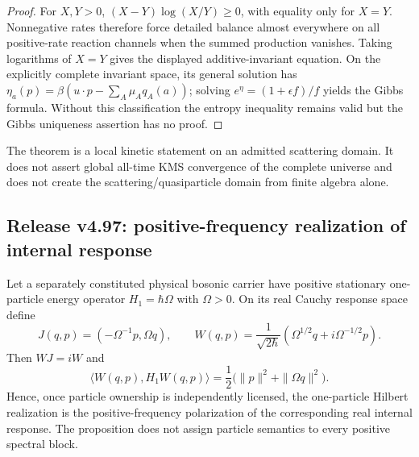 \documentclass[12pt,a4paper]{article}
\begin{document}
\begin{proof}
For $X,Y>0$, $(X-Y)\log(X/Y)\ge0$, with equality only for $X=Y$.
Nonnegative rates therefore force detailed balance almost everywhere on
all positive-rate reaction channels when the summed production vanishes.
Taking logarithms of $X=Y$ gives the displayed additive-invariant equation.
On the explicitly complete invariant space, its general solution has
$\eta_a(p)=\beta(u\cdot p-\sum_A\mu_Aq_A(a))$; solving
$e^\eta=(1+\epsilon f)/f$ yields the Gibbs formula.  Without this
classification the entropy inequality remains valid but the Gibbs
uniqueness assertion has no proof.
\end{proof}

\begin{remark}[Scope]
\label{p4:rem:v496-local-not-global-kms}
The theorem is a local kinetic statement on an admitted scattering domain.  It
does not assert global all-time KMS convergence of the complete universe and
does not create the scattering/quasiparticle domain from finite algebra alone.
\end{remark}




\subsection{Release v4.97: positive-frequency realization of internal response}
\label{p4:sec:v497-internal-response-positive-frequency}

\begin{proposition}
\label{p4:prop:v497-internal-response-positive-frequency}
Let a separately constituted physical bosonic carrier have positive
stationary one-particle energy operator $H_1=\hbar\Omega$ with $\Omega>0$.
On its real Cauchy response space define
\[
 J(q,p)=(-\Omega^{-1}p,\Omega q),
 \qquad
 W(q,p)=\frac{1}{\sqrt{2\hbar}}
 \left(\Omega^{1/2}q+i\Omega^{-1/2}p\right).
\]
Then $WJ=iW$ and
\[
 \langle W(q,p),H_1W(q,p)\rangle
 =\frac12\bigl(\|p\|^2+\|\Omega q\|^2\bigr).
\]
Hence, once particle ownership is independently licensed, the one-particle
Hilbert realization is the positive-frequency polarization of the corresponding
real internal response.  The proposition does not assign particle semantics to
every positive spectral block.
\end{proposition}
\end{document}
